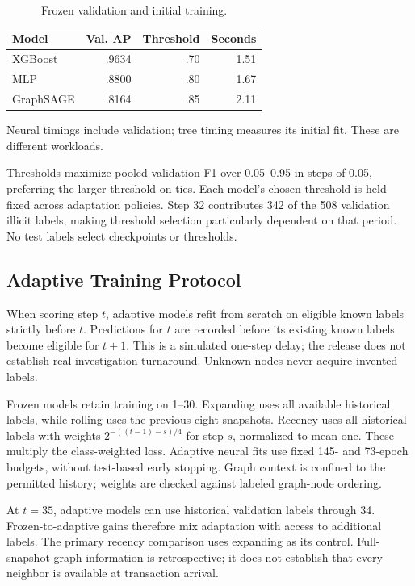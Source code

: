 \documentclass[conference]{IEEEtran}
\begin{document}
\begin{table}[t]\caption{Frozen validation and initial training.}\centering\small
\begin{tabular}{lrrr}\toprule
Model & Val. AP & Threshold & Seconds\\\midrule
XGBoost & .9634 & .70 & 1.51\\
MLP & .8800 & .80 & 1.67\\
GraphSAGE & .8164 & .85 & 2.11\\\bottomrule
\end{tabular}
\par\vspace{3pt}\footnotesize Neural timings include validation; tree timing measures its initial fit. These are different workloads.
\end{table}

Thresholds maximize pooled validation F1 over 0.05--0.95 in steps of 0.05, preferring the larger threshold on ties. Each model's chosen threshold is held fixed across adaptation policies. Step 32 contributes 342 of the 508 validation illicit labels, making threshold selection particularly dependent on that period. No test labels select checkpoints or thresholds.

\subsection{Adaptive Training Protocol}
When scoring step $t$, adaptive models refit from scratch on eligible known labels strictly before $t$. Predictions for $t$ are recorded before its existing known labels become eligible for $t+1$. This is a simulated one-step delay; the release does not establish real investigation turnaround. Unknown nodes never acquire invented labels.

Frozen models retain training on 1--30. Expanding uses all available historical labels, while rolling uses the previous eight snapshots. Recency uses all historical labels with weights $2^{-((t-1)-s)/4}$ for step $s$, normalized to mean one. These multiply the class-weighted loss. Adaptive neural fits use fixed 145- and 73-epoch budgets, without test-based early stopping. Graph context is confined to the permitted history; weights are checked against labeled graph-node ordering.

At $t=35$, adaptive models can use historical validation labels through 34. Frozen-to-adaptive gains therefore mix adaptation with access to additional labels. The primary recency comparison uses expanding as its control. Full-snapshot graph information is retrospective; it does not establish that every neighbor is available at transaction arrival.
\end{document}
